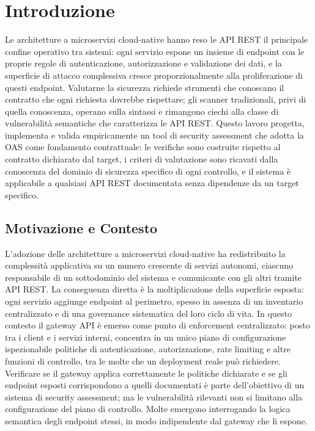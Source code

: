 \chapter{Introduzione}\label{chap:introduction}

Le architetture a microservizi cloud-native hanno reso le \gls{API} \gls{REST} il principale confine operativo tra sistemi: ogni servizio espone un insieme di endpoint con le proprie regole di autenticazione, autorizzazione e validazione dei dati, e la superficie di attacco complessiva cresce proporzionalmente alla proliferazione di questi endpoint. Valutarne la sicurezza richiede strumenti che conoscano il contratto che ogni richiesta dovrebbe rispettare; gli scanner tradizionali, privi di quella conoscenza, operano sulla sintassi e rimangono ciechi alla classe di vulnerabilità semantiche che caratterizza le \gls{API} \gls{REST}. Questo lavoro progetta, implementa e valida empiricamente un tool di security assessment che adotta la \gls{OAS} come fondamento contrattuale: le verifiche sono costruite rispetto al contratto dichiarato dal target, i criteri di valutazione sono ricavati dalla conoscenza del dominio di sicurezza specifico di ogni controllo, e il sistema è applicabile a qualsiasi \gls{API} \gls{REST} documentata senza dipendenze da un target specifico.

\section{Motivazione e Contesto}\label{sec:motivazione}

L'adozione delle architetture a microservizi cloud-native ha redistribuito la complessità applicativa su un numero crescente di servizi autonomi, ciascuno responsabile di un sottodominio del sistema e comunicante con gli altri tramite \gls{API} REST. La conseguenza diretta è la moltiplicazione della superficie esposta: ogni servizio aggiunge endpoint al perimetro, spesso in assenza di un inventario centralizzato e di una governance sistematica del loro ciclo di vita. In questo contesto il gateway \gls{API} è emerso come punto di enforcement centralizzato: posto tra i client e i servizi interni, concentra in un unico piano di configurazione ispezionabile politiche di autenticazione, autorizzazione, rate limiting e altre funzioni di controllo, tra le molte che un deployment reale può richiedere. Verificare se il gateway applica correttamente le politiche dichiarate e se gli endpoint esposti corrispondono a quelli documentati è parte dell'obiettivo di un sistema di security assessment; ma le vulnerabilità rilevanti non si limitano alla configurazione del piano di controllo. Molte emergono interrogando la logica semantica degli endpoint stessi, in modo indipendente dal gateway che li espone.

